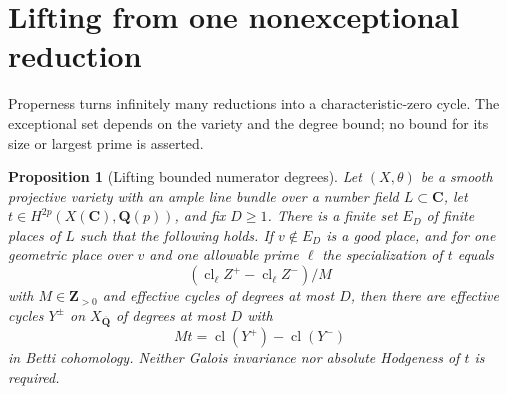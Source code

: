 \documentclass[11pt]{article}
\newtheorem{proposition}[theorem]{Proposition}
\theoremstyle{definition}
\theoremstyle{remark}
\newcommand{\Q}{\mathbf Q}
\newcommand{\Z}{\mathbf Z}
\newcommand{\C}{\mathbf C}
\newcommand{\Qbar}{\overline{\mathbf Q}}
\newcommand{\cl}{\operatorname{cl}}
\begin{document}
\section{Lifting from one nonexceptional reduction}
\label{sec:lifting}

Properness turns infinitely many reductions into a characteristic-zero cycle. The exceptional set depends on the variety and the degree bound; no bound for its size or largest prime is asserted.

\begin{proposition}[Lifting bounded numerator degrees]\label{prop:lift}
Let $(X,\theta)$ be a smooth projective variety with an ample line bundle over a number field $L\subset\C$, let $t\in H^{2p}(X(\C),\Q(p))$, and fix $D\geq1$. There is a finite set $E_D$ of finite places of $L$ such that the following holds. If $v\notin E_D$ is a good place, and for one geometric place over $v$ and one allowable prime $\ell$ the specialization of $t$ equals
\[
 (\cl_\ell Z^+-\cl_\ell Z^-)/M
\]
with $M\in\Z_{>0}$ and effective cycles of degrees at most $D$, then there are effective cycles $Y^\pm$ on $X_{\Qbar}$ of degrees at most $D$ with
\[
 Mt=\cl(Y^+)-\cl(Y^-)
\]
in Betti cohomology. Neither Galois invariance nor absolute Hodgeness of $t$ is required.
\end{proposition}
\end{document}
